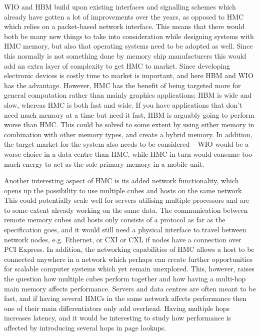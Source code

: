 WIO and HBM build upon existing interfaces and signalling schemes which already have gotten a lot of improvements over the years, as opposed to HMC which relies on a packet-based network interface. This means that there would both be many new things to take into consideration while designing systems with HMC memory, but also that operating systems need to be adopted as well. Since this normally is not something done by memory chip manufacturers this would add an extra layer of complexity to get HMC to market. Since developing electronic devices is costly time to market is important, and here HBM and WIO has the advantage. However, HMC has the benefit of being targeted more for general computation rather than mainly graphics applications; HBM is wide and slow, whereas HMC is both fast and wide. If you have applications that don't need much memory at a time but need it fast, HBM is arguably going to perform worse than HMC. This could be solved to some extent by using either memory in combination with other memory types, and create a hybrid memory. In addition, the target market for the system also needs to be considered -- WIO would be a worse choice in a data centre than HMC, while HMC in turn would consume too much energy to act as the sole primary memory in a mobile unit.
\bigskip

Another interesting aspect of HMC is its added network functionality, which opens up the possibility to use multiple cubes and hosts on the same network. This could potentially scale well for servers utilising multiple processors and are to some extent already working on the same data. The communication between remote memory cubes and hosts only consists of a protocol as far as the specification goes, and it would still need a physical interface to travel between network nodes, e.g. Ethernet, or CXI or CXL if nodes have a connection over PCI Express. In addition, the networking capabilities of HMC allows a host to be connected anywhere in a network which perhaps can create further opportunities for scalable computer systems which yet remain unexplored. This, however, raises the question how multiple cubes perform together and how having a multi-hop main memory affects performance. Servers and data centres are often meant to be fast, and if having several HMCs in the same network affects performance then one of their main differentiators only add overhead. Having multiple hops increases latency, and it would be interesting to study how performance is affected by introducing several hops in page lookups.
\bigskip

